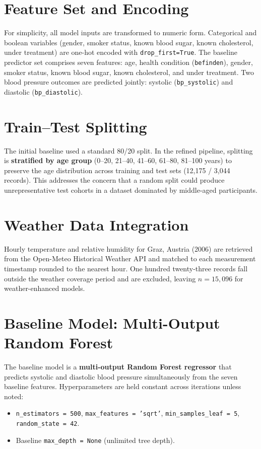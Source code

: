 \section{Feature Set and Encoding}
\label{sec:modelling_features}

For simplicity, all model inputs are transformed to numeric form. Categorical and boolean variables (gender, smoker status, known blood sugar, known cholesterol, under treatment) are one-hot encoded with \texttt{drop\_first=True}. The baseline predictor set comprises seven features: age, health condition (\texttt{befinden}), gender, smoker status, known blood sugar, known cholesterol, and under treatment. Two blood pressure outcomes are predicted jointly: systolic (\texttt{bp\_systolic}) and diastolic (\texttt{bp\_diastolic}).

\section{Train--Test Splitting}
\label{sec:modelling_split}

The initial baseline used a standard 80/20 split. In the refined pipeline, splitting is \textbf{stratified by age group} (0--20, 21--40, 41--60, 61--80, 81--100 years) to preserve the age distribution across training and test sets (12,175 / 3,044 records). This addresses the concern that a random split could produce unrepresentative test cohorts in a dataset dominated by middle-aged participants.

\section{Weather Data Integration}
\label{sec:modelling_weather}

Hourly temperature and relative humidity for Graz, Austria (2006) are retrieved from the Open-Meteo Historical Weather API \cite{open_meteo} and matched to each measurement timestamp rounded to the nearest hour. One hundred twenty-three records fall outside the weather coverage period and are excluded, leaving $n = 15{,}096$ for weather-enhanced models.

\section{Baseline Model: Multi-Output Random Forest}
\label{sec:modelling_baseline}

The baseline model is a \textbf{multi-output Random Forest regressor} that predicts systolic and diastolic blood pressure simultaneously from the seven baseline features. Hyperparameters are held constant across iterations unless noted:
\begin{itemize}
    \item \texttt{n\_estimators = 500}, \texttt{max\_features = 'sqrt'}, \texttt{min\_samples\_leaf = 5}, \texttt{random\_state = 42}.
    \item Baseline \texttt{max\_depth = None} (unlimited tree depth).
\end{itemize}

